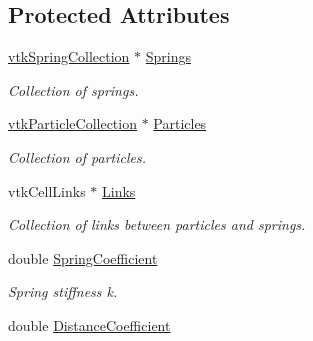 \subsection*{Protected Attributes}
\begin{DoxyCompactItemize}
\item 
\hypertarget{classvtkParticleSpringSystem_a5e7f6fbe96d95148435c5877d26f1a77}{
\hyperlink{classvtkSpringCollection}{vtkSpringCollection} $\ast$ \hyperlink{classvtkParticleSpringSystem_a5e7f6fbe96d95148435c5877d26f1a77}{Springs}}
\label{classvtkParticleSpringSystem_a5e7f6fbe96d95148435c5877d26f1a77}

\begin{DoxyCompactList}\small\item\em Collection of springs. \item\end{DoxyCompactList}\item 
\hypertarget{classvtkParticleSpringSystem_ac8e5bdc3a1529ead05fcb7e0e97422a2}{
\hyperlink{classvtkParticleCollection}{vtkParticleCollection} $\ast$ \hyperlink{classvtkParticleSpringSystem_ac8e5bdc3a1529ead05fcb7e0e97422a2}{Particles}}
\label{classvtkParticleSpringSystem_ac8e5bdc3a1529ead05fcb7e0e97422a2}

\begin{DoxyCompactList}\small\item\em Collection of particles. \item\end{DoxyCompactList}\item 
\hypertarget{classvtkParticleSpringSystem_aa375ef0577337fcddcb2ec27c232a86c}{
vtkCellLinks $\ast$ \hyperlink{classvtkParticleSpringSystem_aa375ef0577337fcddcb2ec27c232a86c}{Links}}
\label{classvtkParticleSpringSystem_aa375ef0577337fcddcb2ec27c232a86c}

\begin{DoxyCompactList}\small\item\em Collection of links between particles and springs. \item\end{DoxyCompactList}\item 
\hypertarget{classvtkParticleSpringSystem_a74a641eebd0c8a96af6539ca81f1baf8}{
double \hyperlink{classvtkParticleSpringSystem_a74a641eebd0c8a96af6539ca81f1baf8}{SpringCoefficient}}
\label{classvtkParticleSpringSystem_a74a641eebd0c8a96af6539ca81f1baf8}

\begin{DoxyCompactList}\small\item\em Spring stiffness k. \item\end{DoxyCompactList}\item 
\hypertarget{classvtkParticleSpringSystem_acba79b202edabd556e88755b3814d9bf}{
double \hyperlink{classvtkParticleSpringSystem_acba79b202edabd556e88755b3814d9bf}{DistanceCoefficient}}
\label{classvtkParticleSpringSystem_acba79b202edabd556e88755b3814d9bf}


\end{DoxyCompactItemize}
